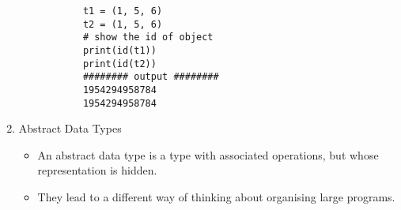 \documentclass[11pt]{article}
\begin{document}
\begin{enumerate}
\begin{itemize}
            \begin{verbatim}
        t1 = (1, 5, 6)
        t2 = (1, 5, 6)
        # show the id of object
        print(id(t1))
        print(id(t2))
        ######## output ########
        1954294958784
        1954294958784
            \end{verbatim}
        \end{itemize}
        \item Abstract Data Types
        \begin{itemize}
            \item  An abstract data type is a type with associated operations, but whose representation is hidden.
            \item They lead to a different way of thinking about organising large programs.
        \end{itemize}
    \end{enumerate}
\end{document}
